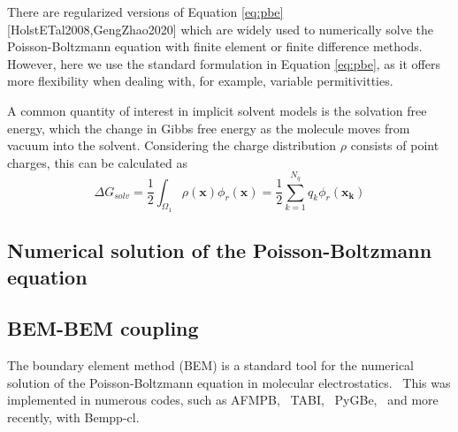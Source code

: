 There are regularized versions of Equation \eqref{eq:pbe} [HolstETal2008,GengZhao2020] which are widely used to numerically solve the Poisson-Boltzmann equation with finite element or finite difference methods.
However, here we use the standard formulation in Equation \eqref{eq:pbe}, as it offers more flexibility when dealing with, for example, variable permitivitties.

A common quantity of interest in implicit solvent models is the solvation free energy, which the change in Gibbs free energy as the molecule moves from vacuum into the solvent. Considering the charge distribution $\rho$ consists of point charges, this can be calculated as
%
\begin{equation}\label{eq:dG} 
\Delta G_{solv} = \frac{1}{2}\int_{\Omega_1} \rho(\mathbf{x})\phi_{r}(\mathbf{x}) = \frac{1}{2}\sum_{k=1}^{N_q} q_k\phi_r(\mathbf{x_k})
\end{equation}

\subsection*{\sffamily \large Numerical solution of the Poisson-Boltzmann equation}

\subsection*{\sffamily \large BEM-BEM coupling}

The boundary element method (BEM) is a standard tool for the numerical solution of the Poisson-Boltzmann equation in molecular electrostatics.~\cite{ZauharMorgan1985, Shaw1985} This was implemented in numerous codes, such as AFMPB,~\cite{LuETal2006} TABI,~\cite{GengKrasny2013} PyGBe,~\cite{CooperBardhanBarba2014,CooperForsythClementiBarba2016} and more recently, with Bempp-cl.~\cite{SearchCooperWout2022} 

